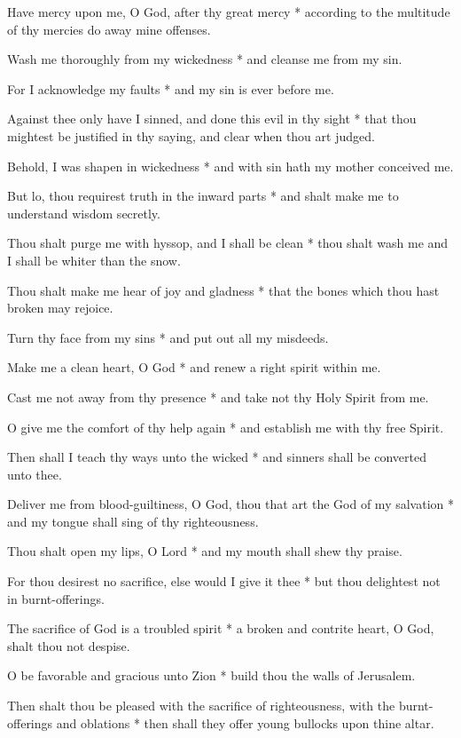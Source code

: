 Have mercy upon me, O God, after thy great mercy * according to the multitude of thy mercies do away mine offenses.
	
Wash me thoroughly from my wickedness * and cleanse me from my sin.
	
For I acknowledge my faults * and my sin is ever before me.
	
Against thee only have I sinned, and done this evil in thy sight * that thou mightest be justified in thy saying, and clear when thou art judged.

Behold, I was shapen in wickedness * and with sin hath my mother conceived me.
	
But lo, thou requirest truth in the inward parts * and shalt make me to understand wisdom secretly.
	
Thou shalt purge me with hyssop, and I shall be clean * thou shalt wash me and I shall be whiter than the snow.
	
Thou shalt make me hear of joy and gladness * that the bones which thou hast broken may rejoice.
	
Turn thy face from my sins * and put out all my misdeeds.
	
Make me a clean heart, O God * and renew a right spirit within me.
	
Cast me not away from thy presence * and take not thy Holy Spirit from me.
	
O give me the comfort of thy help again * and establish me with thy free Spirit.
	
Then shall I teach thy ways unto the wicked * and sinners shall be converted unto thee.
	
Deliver me from blood-guiltiness, O God, thou that art the God of my salvation * and my tongue shall sing of thy righteousness.
	
Thou shalt open my lips, O Lord * and my mouth shall shew thy praise.
	
For thou desirest no sacrifice, else would I give it thee * but thou delightest not in burnt-offerings.
	
The sacrifice of God is a troubled spirit * a broken and contrite heart, O God, shalt thou not despise.
	
O be favorable and gracious unto Zion * build thou the walls of Jerusalem.
	
Then shalt thou be pleased with the sacrifice of righteousness, with the burnt-offerings and oblations * then shall they offer young bullocks upon thine altar.
